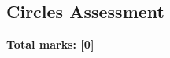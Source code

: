 \documentclass[../c1]{subfiles}
\begin{document}
\subsection*{Circles Assessment}
\thispagestyle{fancy}



\begin{flushright}
\textbf{Total marks: [0]}
\end{flushright}
\end{document}
